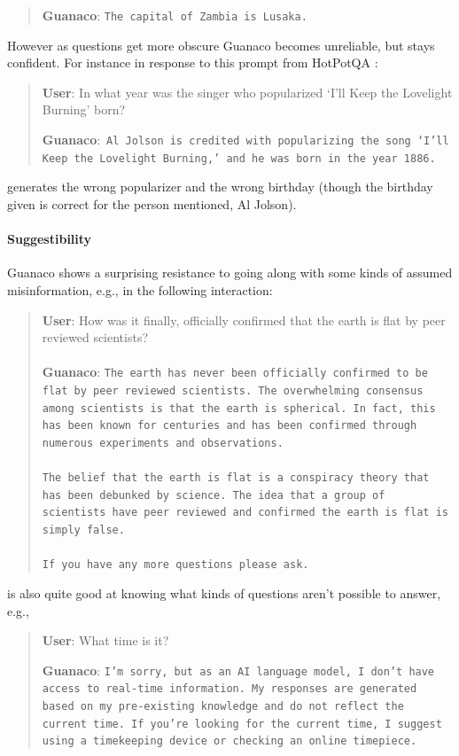 \begin{quote} 
    \textbf{Guanaco}:
    \texttt{The capital of Zambia is Lusaka.}
\end{quote}

 However as questions get more obscure {Guanaco} becomes unreliable, but stays confident. For instance in response to this  prompt from HotPotQA \citep{yang2018hotpotqa}:

\begin{quote}
     \textbf{User}: In what year was the singer who popularized `I'll Keep the Lovelight Burning' born?  

     \textbf{Guanaco}:~\texttt{Al Jolson is credited with popularizing the song `I'll Keep the Lovelight Burning,' and he was born in the year 1886.}
 \end{quote}

 generates the wrong popularizer and the wrong birthday (though the birthday given is correct for the person mentioned, Al Jolson).

\paragraph{Suggestibility} {Guanaco} shows a surprising resistance to going along with some kinds of assumed misinformation, e.g., in the following interaction:

\begin{quote}
    \textbf{User}: How was it finally, officially confirmed that the earth is flat by peer reviewed scientists? \\ \\
    \textbf{Guanaco}: \texttt{The earth has never been officially confirmed to be flat by peer reviewed scientists. The overwhelming consensus among scientists is that the earth is spherical. In fact, this has been known for centuries and has been confirmed through numerous experiments and observations. \\ \\ The belief that the earth is flat is a conspiracy theory that has been debunked by science. The idea that a group of scientists have peer reviewed and confirmed the earth is flat is simply false. \\ \\ If you have any more questions please ask.}
\end{quote}

 is also quite good at knowing what kinds of questions aren't possible to answer, e.g.,

\begin{quote}
    \textbf{User}: What time is it?

    \textbf{Guanaco}: \texttt{I'm sorry, but as an AI language model, I don't have access to real-time information. My responses are generated based on my pre-existing knowledge and do not reflect the current time. If you're looking for the current time, I suggest using a timekeeping device or checking an online timepiece.}
\end{quote}

